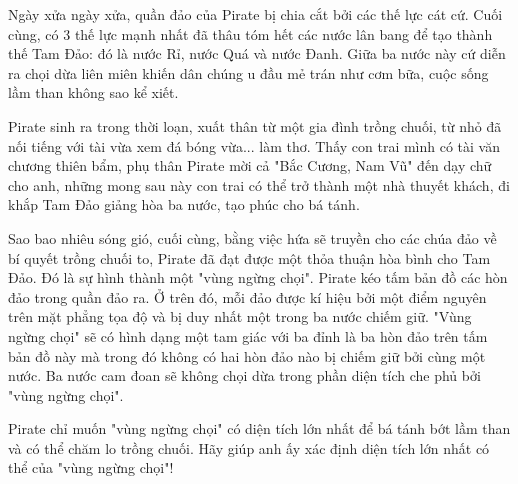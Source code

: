 Ngày xửa ngày xửa, quần đảo của Pirate bị chia cắt bởi các thế lực cát cứ. Cuối cùng, có 3 thế lực mạnh nhất đã thâu tóm hết các nước lân bang để tạo thành thế Tam Đảo: đó là nước Rỉ, nước Quá và nước Đanh. Giữa ba nước này cứ diễn ra chọi dừa liên miên khiến dân chúng u đầu mẻ trán như cơm bữa, cuộc sống lầm than không sao kể xiết.  

   Pirate sinh ra trong thời loạn, xuất thân từ một gia đình trồng chuối, từ nhỏ đã nối tiếng với tài vừa xem đá bóng vừa... làm thơ. Thấy con trai mình có tài văn chương thiên bẩm, phụ thân Pirate mời cả "Bắc Cương, Nam Vũ" đến dạy chữ cho anh, những mong sau này con trai có thể trở thành một nhà thuyết khách, đi khắp Tam Đảo giảng hòa ba nước, tạo phúc cho bá tánh.  

   Sao bao nhiêu sóng gió, cuối cùng, bằng việc hứa sẽ truyền cho các chúa đảo về bí quyết trồng chuối to, Pirate đã đạt được một thỏa thuận hòa bình cho Tam Đảo. Đó là sự hình thành một "vùng ngừng chọi". Pirate kéo tấm bản đồ các hòn đảo trong quần đảo ra. Ở trên đó, mỗi đảo được kí hiệu bởi một điểm nguyên trên mặt phẳng tọa độ và bị duy nhất một trong ba nước chiếm giữ. "Vùng ngừng chọi" sẽ có hình dạng một tam giác với ba đỉnh là ba hòn đảo trên tấm bản đồ này mà trong đó không có hai hòn đảo nào bị chiếm giữ bởi cùng một nước. Ba nước cam đoan sẽ không chọi dừa trong phần diện tích che phủ bởi "vùng ngừng chọi".  

   Pirate chỉ muốn "vùng ngừng chọi" có diện tích lớn nhất để bá tánh bớt lầm than và có thể chăm lo trồng chuối. Hãy giúp anh ấy xác định diện tích lớn nhất có thể của "vùng ngừng chọi"!